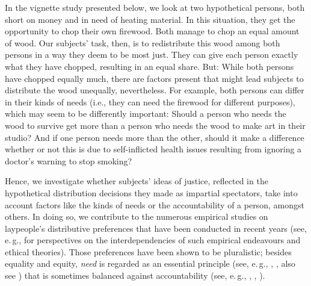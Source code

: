 \documentclass[egregdoesnotlikesansseriftitles]{scrartcl}
\begin{document}
In the vignette study presented below, we look at two hypothetical persons, both short on money and in need of heating material.
In this situation, they get the opportunity to chop their own firewood.
Both manage to chop an equal amount of wood.
Our subjects' task, then, is to redistribute this wood among both persons in a way they deem to be most just.
They can give each person exactly what they have chopped, resulting in an equal share.
But: While both persons have chopped equally much, there are factors present that might lead subjects to distribute the wood unequally, nevertheless.
For example, both persons can differ in their kinds of needs (i.e., they can need the firewood for different purposes), which may seem to be differently important: Should a person who needs the wood to survive get more than a person who needs the wood to make art in their studio?
And if one person needs more than the other, should it make a difference whether or not this is due to self-inflicted health issues resulting from ignoring a doctor's warning to stop smoking?

Hence, we investigate whether subjects' ideas of justice, reflected in the hypothetical distribution decisions they made as impartial spectators, take into account factors like the kinds of needs or the accountability of a person, amongst others.
In doing so, we contribute to the numerous empirical studies on laypeople's distributive preferences that have been conducted in recent years (see, e.\,g., \citealt{bauer_philosophie_2019,bauer_empirical_2020} for perspectives on the interdependencies of such empirical endeavours and ethical theories).
Those preferences have been shown to be pluralistic; besides equality and equity, \textit{need} is regarded as an essential principle (see, e.\,g., \citealt{konow_fair_2001, konow_which_2003}, \citealt{weis_needs_2017}, also see \citealt{miller_needs-based_2020}) that is sometimes balanced against accountability (see, e.\,g., \citealt{konow_fair_2001}, \citealt{schwettmann_trading_2009}, \citealt{bauer_need_2020}).
\end{document}
